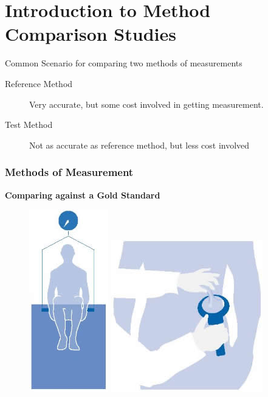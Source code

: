 \documentclass[compress]{beamer}        %
\begin{document}
		\section[Introduction]{Introduction to Method Comparison Studies}
\begin{frame}
	\large
Common Scenario for comparing two methods of measurements \\ \bigskip	\begin{description}
		\item[Reference Method] Very accurate, but some cost involved in getting measurement. \\ \bigskip
		\item[Test Method] Not as accurate as reference method, but less cost involved
	\end{description}
\end{frame}
\begin{frame}
	\frametitle{Methods of Measurement}
	\textbf{Comparing against a Gold Standard}
	\begin{figure}
		\centering
		\includegraphics[width=0.18\linewidth]{images/watertest}
		\includegraphics[width=0.36\linewidth]{images/calipers}
	\end{figure}
	
\end{frame}
\end{document}
